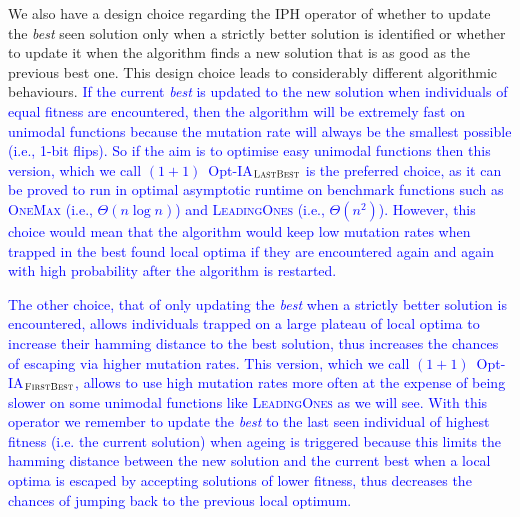 \documentclass[lettersize,journal]{IEEEtran}
\begin{document}
 
{\color{blue} We also have  a design choice regarding the IPH operator  of whether to update the {\it best} seen solution only when a strictly better solution is identified or whether to update it when the algorithm finds a new solution that is as good as the previous best one. 
This design choice leads to considerably different algorithmic behaviours.}
\textcolor{blue}{If the current {\it best} is updated to the new solution when individuals of equal fitness are encountered,  then the algorithm will be extremely fast on unimodal functions because the mutation rate will always be the smallest possible (i.e., 1-bit flips). So if the aim is to optimise easy unimodal functions then this version, which we call $(1+1)$~Opt-IA$_{\textsc{LastBest}}$ is the preferred choice, as it can be proved to run in optimal asymptotic runtime on benchmark functions such as \textsc{OneMax} (i.e., $\Theta(n \log n)$) and \textsc{LeadingOnes} (i.e., $\Theta(n^2)$). However, this choice would mean that the algorithm would keep low mutation rates when trapped in the best found local optima if they are encountered again and again with high probability after the algorithm is restarted.}

\textcolor{blue}{
The other choice, that of only updating the {\it best} when a strictly better solution is encountered, allows individuals trapped on a large plateau of local optima to increase their hamming distance to the best solution, thus increases the chances of escaping via higher mutation rates. This version, which we call $(1+1)$~Opt-IA$_{\textsc{FirstBest}}$, allows to use high mutation rates more often at the expense of being slower on some unimodal functions like \textsc{LeadingOnes} as we will see. With this operator we remember to update the {\it best} to the last seen individual of highest fitness (i.e. the current solution) when ageing is triggered because this limits the hamming distance between the new solution and the current best when a local optima is escaped by accepting solutions of lower fitness, thus decreases the chances of jumping back to the previous local optimum.}
	
\end{document}
